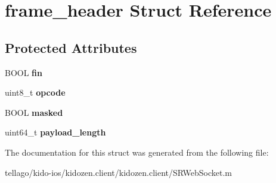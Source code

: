 \hypertarget{structframe__header}{\section{frame\-\_\-header Struct Reference}
\label{structframe__header}
}
\subsection*{Protected Attributes}
\begin{DoxyCompactItemize}
\item 
\hypertarget{structframe__header_aee3a595023a4a8114b26f62132d9e7b0}{B\-O\-O\-L {\bfseries fin}}\label{structframe__header_aee3a595023a4a8114b26f62132d9e7b0}

\item 
\hypertarget{structframe__header_a2cc21e84c2d9951b8f369e37eb3a082d}{uint8\-\_\-t {\bfseries opcode}}\label{structframe__header_a2cc21e84c2d9951b8f369e37eb3a082d}

\item 
\hypertarget{structframe__header_a3565565addf615b8d5a5cb8a8464fab4}{B\-O\-O\-L {\bfseries masked}}\label{structframe__header_a3565565addf615b8d5a5cb8a8464fab4}

\item 
\hypertarget{structframe__header_a9b5e106ceb7704a3c1bf5ed234653b30}{uint64\-\_\-t {\bfseries payload\-\_\-length}}\label{structframe__header_a9b5e106ceb7704a3c1bf5ed234653b30}

\end{DoxyCompactItemize}


The documentation for this struct was generated from the following file\-:\begin{DoxyCompactItemize}
\item 
tellago/kido-\/ios/kidozen.\-client/kidozen.\-client/S\-R\-Web\-Socket.\-m\end{DoxyCompactItemize}
